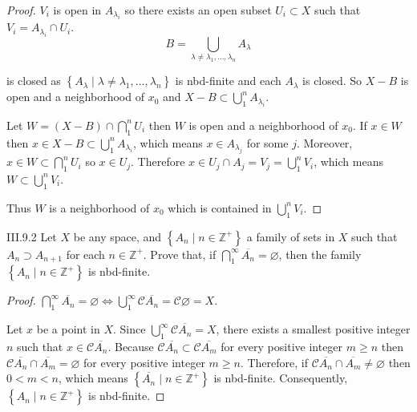 \begin{proof}
	\( V_{i} \) is open in \( A_{\lambda_{i}} \) so there exists an open subset \( U_{i} \subset X \) such that \( V_{i} = A_{\lambda_{i}} \cap U_{i} \).
	\[
		B = \bigcup_{\lambda \ne \lambda_{1}, \ldots, \lambda_{n}} A_{\lambda}
	\]

	is closed as \( \left\{ A_{\lambda} \mid \lambda \ne \lambda_{1}, \ldots, \lambda_{n} \right\} \) is nbd-finite and each \( A_{\lambda} \) is closed. So \( X - B \) is open and a neighborhood of \( x_{0} \) and \( X - B \subset \bigcup^{n}_{1} A_{\lambda_{i}} \).

	Let \( W = (X - B) \cap \bigcap^{n}_{1} U_{i} \) then \( W \) is open and a neighborhood of \( x_{0} \). If \( x \in W \) then \( x \in X - B \subset \bigcup^{n}_{1} A_{\lambda_{i}} \), which means \( x \in A_{\lambda_{j}} \) for some \( j \). Moreover, \( x \in W \subset \bigcap^{n}_{1} U_{i} \) so \( x \in U_{j} \). Therefore \( x \in U_{j} \cap A_{j} = V_{j} = \bigcup^{n}_{1} V_{i} \), which means \( W \subset \bigcup^{n}_{1} V_{i} \).

	Thus \( W \) is a neighborhood of \( x_{0} \) which is contained in \( \bigcup^{n}_{1} V_{i} \).
\end{proof}

\begin{problem}{III.9.2}
Let \(X\) be any space, and \( \left\{ A_{n} \mid n \in \mathbb{Z}^{+} \right\} \) a family of sets in \(X\) such that \( A_{n} \supset A_{n+1} \) for each \( n \in \mathbb{Z}^{+} \). Prove that, if \( \bigcap^{\infty}_{1} \overline{A_{n}} = \varnothing \), then the family \( \left\{ A_{n} \mid n \in \mathbb{Z}^{+} \right\} \) is nbd-finite.
\end{problem}

\begin{proof}
	\( \bigcap^{\infty}_{1} \overline{A_{n}} = \varnothing \iff \bigcup^{\infty}_{1} \mathscr{C}\overline{A_{n}} = \mathscr{C}\varnothing = X \).

	Let \( x \) be a point in \( X \). Since \( \bigcup^{\infty}_{1} \mathscr{C}\overline{A_{n}} = X \), there exists a smallest positive integer \( n \) such that \( x \in \mathscr{C}\overline{A_{n}} \). Because \( \mathscr{C}\overline{A_{n}} \subset \mathscr{C}\overline{A_{m}} \) for every positive integer \( m \ge n \) then \( \mathscr{C}\overline{A_{n}} \cap \overline{A_{m}} = \varnothing \) for every positive integer \( m \ge n \). Therefore, if \( \mathscr{C}\overline{A_{n}} \cap \overline{A_{m}} \ne \varnothing \) then \( 0 < m < n \), which means \( \left\{ \overline{A_{n}} \mid n \in \mathbb{Z}^{+} \right\} \) is nbd-finite. Consequently, \( \left\{ A_{n} \mid n \in \mathbb{Z}^{+} \right\} \) is nbd-finite.
\end{proof}

